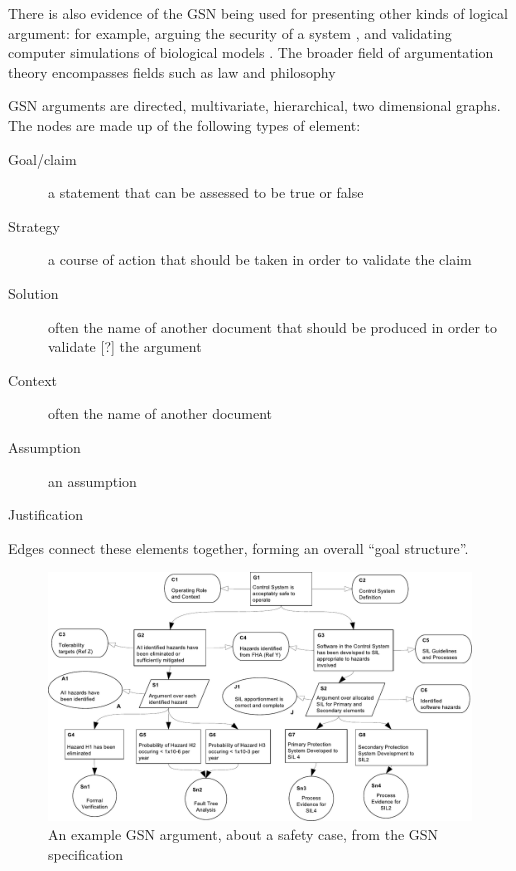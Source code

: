 There is also evidence of the GSN being used for presenting other kinds of logical argument:
for example,
arguing the security of a system \cite{plop},
and validating computer simulations of biological models \cite{insilico,royal}.
The broader field of argumentation theory encompasses fields such as law and philosophy 

GSN arguments are directed, multivariate, hierarchical, two dimensional graphs.
The nodes are made up of the following types of element:

\begin{description}

  \item[ Goal/claim ]
    a statement that can be assessed to be true or false

  \item[ Strategy]
    a course of action that should be taken in order to validate the claim
  
  \item[ Solution]
      often the name of another document that should be produced in order to validate [?] the argument 

  \item[ Context]
    often the name of another document

  \item[ Assumption]
    an assumption

  \item[ Justification]

\end{description}

Edges connect these elements together, forming an overall ``goal structure''. 

\begin{figure}
  \centering
  \includegraphics[width=\textwidth]{graphics/example_argument.pdf}
  \caption{An example GSN argument, about a safety case,
    from the GSN specification \cite{gsnstandard}}
  \label{fig:crampedex1}
\end{figure}




